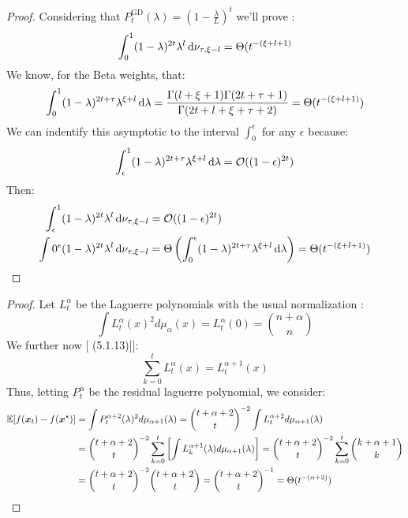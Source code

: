 \documentclass{article}
\begin{document}
\gdrates*
\begin{proof}
Considering that $P_t^\text{GD}(\lambda)=(1-\frac{\lambda}{L})^t$ we'll prove :
\begin{equation}
    \int_0^1(1-\lambda)^{2t}\lambda^l\mathop{}\!\mathrm{d}\nu_{\tau,\xi-l}=\Theta(t^{-(\xi+l+1)}
\end{equation}
We know, for the Beta weights, that:
\begin{equation}
    \int_0^1(1-\lambda)^{2t+\tau}\lambda^{\xi+l}\mathop{}\!\mathrm{d}\lambda=\frac{\Gamma(l+\xi+1)\Gamma(2t+\tau+1)}{\Gamma(2t+l+\xi+\tau+2)}=\Theta(t^{-(\xi+l+1)})
\end{equation}
We can indentify this asymptotic to the interval $\int_0^\epsilon$ for any $\epsilon$ because:
\begin{equation}
    \int_\epsilon^1(1-\lambda)^{2t+\tau}\lambda^{\xi+l}\mathop{}\!\mathrm{d}\lambda=\mathcal{O}((1-\epsilon)^{2t})
\end{equation}
Then:
\begin{align}
    \int_\epsilon^1(1-\lambda)^{2t}\lambda^l\mathop{}\!\mathrm{d}\nu_{\tau,\xi-l}&=\mathcal{O}((1-\epsilon)^{2t}) \\
    \int0^\epsilon(1-\lambda)^{2t}\lambda^l\mathop{}\!\mathrm{d}\nu_{\tau,\xi-l}&=\Theta\left(\int_0^\epsilon(1-\lambda)^{2t+\tau}\lambda^{\xi+l}\mathop{}\!\mathrm{d}\lambda\right)=\Theta(t^{-(\xi+l+1)})
\end{align}

\end{proof}
\laguerrerates*
\begin{proof}
Let $L_t^\alpha$ be the Laguerre polynomials with the usual normalization \cite{szego1975orthogonal}:
\begin{equation}
    \int L_t^\alpha(x)^2d\mu_\alpha(x)=L_t^\alpha(0)=\binom{n+\alpha}{n} 
\end{equation}
We further now [\cite{szego1975orthogonal} (5.1.13)]]:
\begin{equation}
    \sum_{k=0}^tL_t^\alpha(x)=L_t^{\alpha+1}(x)
\end{equation}
Thus, letting $P_t^\alpha$ be the residual laguerre polynomial, we consider:
\begin{equation}
\begin{split}
    {\mathbb{E}}[f({\boldsymbol x}_t)-f({\boldsymbol x}^\star)]&=\int P_t^{\alpha+2}(\lambda)^2d\mu_{\alpha+1}(\lambda)=\binom{t+\alpha+2}{t}^{-2}\int L_t^{\alpha+2}d\mu_{\alpha+1}(\lambda)\\
    &=\binom{t+\alpha+2}{t}^{-2}\sum_{k=0}^{t}\left[\int L_k^{\alpha+1}(\lambda)d\mu_{\alpha+1}(\lambda)\right]=\binom{t+\alpha+2}{t}^{-2}\sum_{k=0}^t\binom{k+\alpha+1}{k}\\
    &=\binom{t+\alpha+2}{t}^{-2}\binom{t+\alpha+2}{t}=\binom{t+\alpha+2}{t}^{-1}=\Theta( t^{-(\alpha+2)})
\end{split}
\end{equation}
\end{proof}
\end{document}
